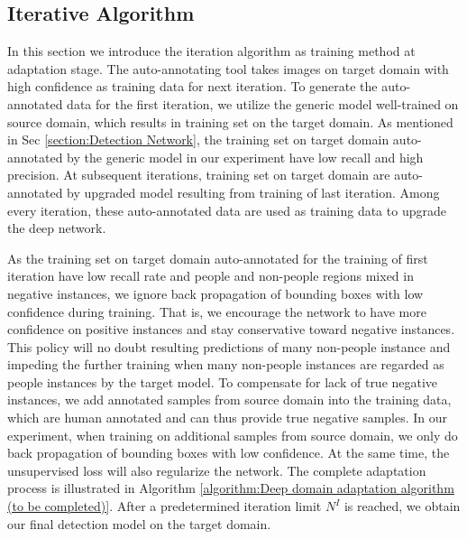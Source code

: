 \documentclass[runningheads]{llncs}
\begin{document}
\subsection{Iterative Algorithm}
\label{Section:Iterative Algorithm}
In this section we introduce the iteration algorithm as training method at adaptation stage. The auto-annotating tool takes images on target domain with high confidence as training data for next iteration. To generate the auto-annotated data for the first iteration, we utilize the generic model well-trained on source domain, which results in training set on the target domain. As mentioned in Sec \ref{section:Detection Network}, the training set on target domain auto-annotated by the generic model in our experiment have low recall and high precision. At subsequent iterations, training set on target domain are auto-annotated by upgraded model resulting from training of last iteration. Among every iteration, these auto-annotated data are used as training data to upgrade the deep network.

As the training set on target domain auto-annotated for the training of first iteration have low recall rate and people and non-people regions mixed in negative instances, we ignore back propagation of bounding boxes with low confidence during training. That is, we encourage the network to have more confidence on positive instances and stay conservative toward negative instances. This policy will no doubt resulting predictions of many non-people instance and impeding the further training when many non-people instances are regarded as people instances by the target model. To compensate for lack of true negative instances, we add annotated samples from source domain into the training data, which are human annotated and can thus provide true negative samples. In our experiment, when training on additional samples from source domain, we only do back propagation of bounding boxes with low confidence. At the same time, the unsupervised loss will also regularize the network. The complete adaptation process is illustrated in Algorithm \ref{algorithm:Deep domain adaptation algorithm (to be completed)}. After a predetermined iteration limit $N^{I}$ is reached, we obtain our final detection model on the target domain.
\end{document}
